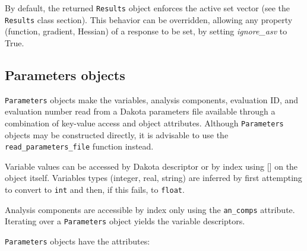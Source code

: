 By default, the returned {\tt Results} object enforces the active set vector (see the {\tt Results} class section).
This behavior can be overridden, allowing any property (function, gradient, Hessian) of a response to be set, by
setting \emph{ignore\_asv} to True.


\subsection{Parameters objects}

{\tt Parameters} objects make the variables, analysis components, evaluation ID, and evaluation number read from a Dakota parameters file available through a combination of key-value access and object attributes. Although {\tt Parameters} objects may be constructed directly, it is advisable to use the {\tt read\_parameters\_file} function instead.

Variable values can be accessed by Dakota descriptor or by index using {[}{]} on the object itself. Variables types (integer, real, string) are inferred by first attempting to convert to {\tt int} and then, if this fails, to {\tt float}.

Analysis components are accessible by index only using the {\tt an\_comps} attribute. Iterating over a {\tt Parameters} 
object yields the variable descriptors.

{\tt Parameters} objects have the attributes:

